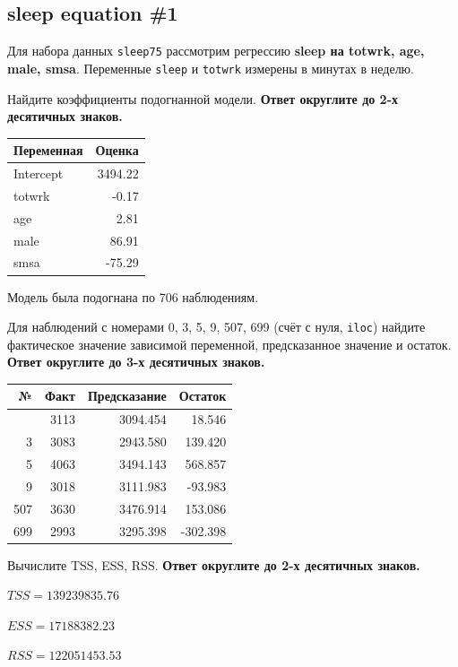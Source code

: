 \documentclass[
  russian,
]{article}
\newcounter{none} %
\begin{document}
\subsection{sleep equation \#1}\label{sleep-equation-1}

Для набора данных \texttt{sleep75} рассмотрим регрессию \textbf{sleep на
totwrk, age, male, smsa}. Переменные \texttt{sleep} и \texttt{totwrk}
измерены в минутах в неделю.

Найдите коэффициенты подогнанной модели. \textbf{Ответ округлите до 2-х
десятичных знаков.}

{\def\LTcaptype{none} %
\begin{longtable}[]{@{}lr@{}}
\toprule\noalign{}
Переменная & Оценка \\
\midrule\noalign{}
\endhead
\bottomrule\noalign{}
\endlastfoot
Intercept & 3494.22 \\
totwrk & -0.17 \\
age & 2.81 \\
male & 86.91 \\
smsa & -75.29 \\
\end{longtable}
}

Модель была подогнана по 706 наблюдениям.

Для наблюдений с номерами 0, 3, 5, 9, 507, 699 (счёт с нуля,
\texttt{iloc}) найдите фактическое значение зависимой переменной,
предсказанное значение и остаток. \textbf{Ответ округлите до 3-х
десятичных знаков.}

{\def\LTcaptype{none} %
\begin{longtable}[]{@{}rrrr@{}}
\toprule\noalign{}
№ & Факт & Предсказание & Остаток \\
\midrule\noalign{}
\endhead
\bottomrule\noalign{}
\endlastfoot
0 & 3113 & 3094.454 & 18.546 \\
3 & 3083 & 2943.580 & 139.420 \\
5 & 4063 & 3494.143 & 568.857 \\
9 & 3018 & 3111.983 & -93.983 \\
507 & 3630 & 3476.914 & 153.086 \\
699 & 2993 & 3295.398 & -302.398 \\
\end{longtable}
}

Вычислите TSS, ESS, RSS. \textbf{Ответ округлите до 2-х десятичных
знаков.}

\begin{tcolorbox}[enhanced jigsaw, arc=.35mm, bottomrule=.15mm, bottomtitle=1mm, breakable, colback=white, colbacktitle=quarto-callout-note-color!10!white, colframe=quarto-callout-note-color-frame, coltitle=black, left=2mm, leftrule=.75mm, opacityback=0, opacitybacktitle=0.6, rightrule=.15mm, title=\textcolor{quarto-callout-note-color}{\faInfo}\hspace{0.5em}{Суммы квадратов}, titlerule=0mm, toprule=.15mm, toptitle=1mm]

\(TSS = 139239835.76\)

\(ESS = 17188382.23\)

\(RSS = 122051453.53\)

\end{tcolorbox}
\end{document}
